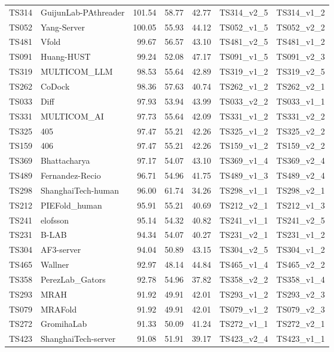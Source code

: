 \begin{table}[ht]
{\begin{tabular}{llrrrll}
TS314 & GuijunLab-PAthreader & 101.54 & 58.77 & 42.77 & TS314\_v2\_5 & TS314\_v1\_2 \\ 
TS052 & Yang-Server & 100.05 & 55.93 & 44.12 & TS052\_v1\_5 & TS052\_v2\_2 \\ 
TS481 & Vfold & 99.67 & 56.57 & 43.10 & TS481\_v2\_5 & TS481\_v1\_2 \\ 
TS091 & Huang-HUST & 99.24 & 52.08 & 47.17 & TS091\_v1\_5 & TS091\_v2\_3 \\ 
TS319 & MULTICOM\_LLM & 98.53 & 55.64 & 42.89 & TS319\_v1\_2 & TS319\_v2\_5 \\ 
TS262 & CoDock & 98.36 & 57.63 & 40.74 & TS262\_v1\_2 & TS262\_v2\_1 \\ 
TS033 & Diff & 97.93 & 53.94 & 43.99 & TS033\_v2\_2 & TS033\_v1\_1 \\ 
TS331 & MULTICOM\_AI & 97.73 & 55.64 & 42.09 & TS331\_v1\_2 & TS331\_v2\_2 \\ 
TS325 & 405 & 97.47 & 55.21 & 42.26 & TS325\_v1\_2 & TS325\_v2\_2 \\ 
TS159 & 406 & 97.47 & 55.21 & 42.26 & TS159\_v1\_2 & TS159\_v2\_2 \\ 
TS369 & Bhattacharya & 97.17 & 54.07 & 43.10 & TS369\_v1\_4 & TS369\_v2\_4 \\ 
TS489 & Fernandez-Recio & 96.71 & 54.96 & 41.75 & TS489\_v1\_3 & TS489\_v2\_4 \\ 
TS298 & ShanghaiTech-human & 96.00 & 61.74 & 34.26 & TS298\_v1\_1 & TS298\_v2\_1 \\ 
TS212 & PIEFold\_human & 95.91 & 55.21 & 40.69 & TS212\_v2\_1 & TS212\_v1\_3 \\ 
TS241 & elofsson & 95.14 & 54.32 & 40.82 & TS241\_v1\_1 & TS241\_v2\_5 \\ 
TS231 & B-LAB & 94.34 & 54.07 & 40.27 & TS231\_v2\_1 & TS231\_v1\_2 \\ 
TS304 & AF3-server & 94.04 & 50.89 & 43.15 & TS304\_v2\_5 & TS304\_v1\_2 \\ 
TS465 & Wallner & 92.97 & 48.14 & 44.84 & TS465\_v1\_4 & TS465\_v2\_2 \\ 
TS358 & PerezLab\_Gators & 92.78 & 54.96 & 37.82 & TS358\_v2\_2 & TS358\_v1\_4 \\ 
TS293 & MRAH & 91.92 & 49.91 & 42.01 & TS293\_v1\_2 & TS293\_v2\_3 \\ 
TS079 & MRAFold & 91.92 & 49.91 & 42.01 & TS079\_v1\_2 & TS079\_v2\_3 \\ 
TS272 & GromihaLab & 91.33 & 50.09 & 41.24 & TS272\_v1\_1 & TS272\_v2\_1 \\ 
TS423 & ShanghaiTech-server & 91.08 & 51.91 & 39.17 & TS423\_v2\_4 & TS423\_v1\_1 \\ 

\end{tabular}}
\end{table}
